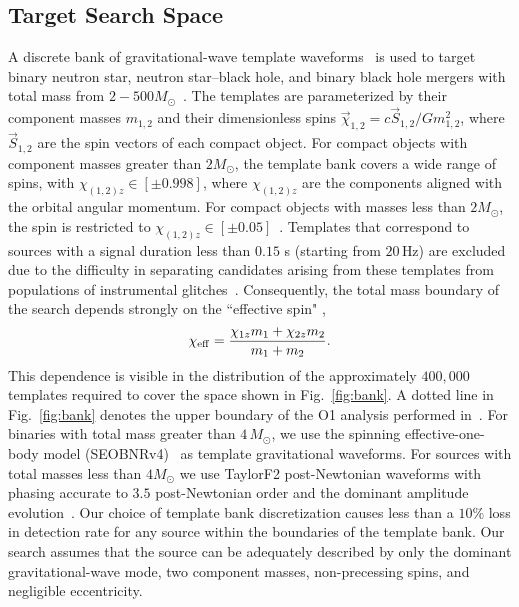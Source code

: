 \subsection{Target Search Space}

A discrete bank of gravitational-wave template waveforms~\citep{Owen:1995tm,Owen:1998dk,Brown:2012qf} is used to target binary neutron star,
neutron star--black hole, and binary black hole mergers with total mass from $2-500 M_{\odot}$~\citep{DalCanton:2017ala}. The templates are
parameterized by their component masses $m_{1,2}$ and their dimensionless spins  $\vec{\chi}_{1,2} = c \vec{S}_{1,2}/G m_{1,2}^2$, where
$\vec{S}_{1,2}$ are the spin vectors of each compact object.  For compact objects with component
masses greater than $2 M_{\odot}$, the template bank covers a wide range of spins, with $\chi_{(1,2)z} \in [\pm 0.998]$, where $\chi_{(1,2)z}$ are the components aligned with the orbital angular momentum. For compact objects
with masses less than  $2 M_{\odot}$, the spin is restricted to $\chi_{(1,2)z} \in [\pm 0.05]$~\citep{Brown:2012qf}. Templates that correspond
to sources with a signal duration less than $0.15$ s (starting from $20\,$Hz) are excluded due to the difficulty in separating candidates arising from
these templates from populations of instrumental glitches~\citep{DalCanton:2017ala}. Consequently, the total mass boundary of the search
depends strongly on the ``effective spin" \citep{Racine:2008qv, Ajith:2009bn},
%
\begin{equation}\label{eq:chi_effective}
\chi_{\mathrm{eff}} = \frac{\chi_{1z} m_1 + \chi_{2z} m_2}{m_1+m_2}.
\end{equation}
%
This dependence is visible in the distribution of the approximately $400,000$ templates required to cover the space shown in Fig.~\ref{fig:bank}. A dotted line in Fig.~\ref{fig:bank} denotes the upper boundary of the O1 analysis performed in~\cite{TheLIGOScientific:2016pea}. For binaries with total mass greater than $4\,M_\odot$, we use the spinning effective-one-body model (SEOBNRv4)~\citep{Taracchini:2013,Bohe:2016gbl} as template gravitational waveforms. For sources with total masses less than $4M_{\odot}$ we use TaylorF2 post-Newtonian waveforms with phasing accurate to $3.5$ post-Newtonian order and the dominant amplitude evolution~\citep{Sathyaprakash:1991mt,Droz:1999qx,Blanchet:2002av,Faye:2012we}. Our choice of template bank discretization causes less than a $10\%$ loss in detection rate for any source within the boundaries of the template bank. Our search assumes that the source can be adequately described by only the dominant gravitational-wave mode, two component masses, non-precessing spins, and negligible eccentricity.


